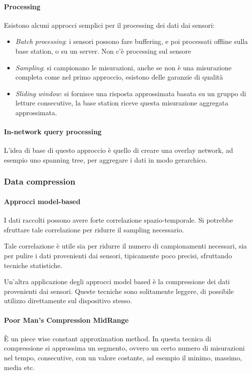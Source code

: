\paragraph{Processing}
Esistono alcuni approcci semplici per il processing dei dati dai sensori:
\begin{itemize}
    \item \emph{Batch processing}: i sensori possono fare buffering, e poi processati offline sulla base station, 
    o su un server.
    Non c'è processing sul sensore
    \item \emph{Sampling}: si campionano le misurazioni, anche se non 
    è una misurazione completa come nel primo approccio, esistono delle garanzie 
    di qualità
    \item \emph{Sliding window}: si fornisce una risposta approssimata 
    basata su un gruppo di letture consecutive, la base station 
    riceve questa misurazione aggregata approssimata.
\end{itemize}

\paragraph{In-network query processing}
L'idea di base di questo approccio è quello 
di creare una overlay network, ad esempio uno spanning tree, 
per aggregare i dati in modo gerarchico.

\subsubsection{Data compression}

\paragraph{Approcci model-based}
I dati raccolti possono avere forte correlazione spazio-temporale.
Si potrebbe sfruttare tale correlazione per ridurre il sampling necessario.

Tale correlazione è utile sia per ridurre il numero di campionamenti 
necessari, sia per pulire i dati provenienti dai sensori, tipicamente 
poco precisi, sfruttando tecniche statistiche.

Un'altra applicazione degli approcci model based è la compressione dei dati 
provenienti dai sensori.
Queste tecniche sono solitamente leggere, di possibile utilizzo direttamente 
sul dispositivo stesso.

\paragraph{Poor Man's Compression MidRange}
È un piece wise constant approximation method.
In questa tecnica di compressione si approssima un segmento, 
ovvero un certo numero di misurazioni nel tempo, consecutive, 
con un valore costante, ad esempio il minimo, massimo, media etc.

